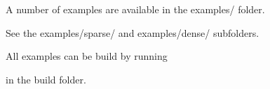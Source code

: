 A number of examples are available in the examples/ folder.

See the examples/sparse/ and examples/dense/ subfolders.

All examples can be build by running 
\begin{DoxyCode}{0}

\end{DoxyCode}
 in the build folder. 
